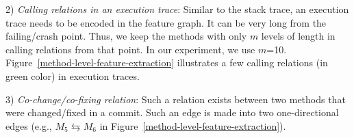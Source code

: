 
2) {\em Calling relations in an execution trace}:
Similar to the stack trace, an execution trace needs to be encoded in
the feature graph. It can be very long from the failing/crash
point. Thus, we keep the methods with only $m$ levels of length in
calling relations from that point. In our experiment, we use
$m$=10. Figure~\ref{method-level-feature-extraction} illustrates a few
calling relations (in green color) in execution traces.

3) {\em Co-change/co-fixing relation}: Such a relation
exists between two methods that were changed/fixed in a commit. Such
an edge is made into two one-directional edges (e.g., $M_5
\leftrightarrows M_6$ in
Figure~\ref{method-level-feature-extraction}).



